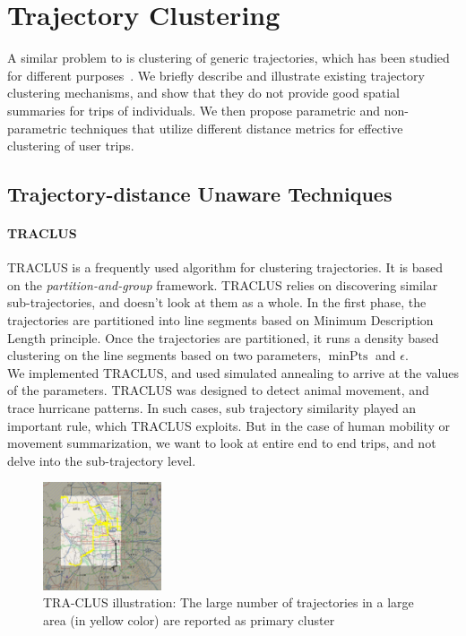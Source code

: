 \section{Trajectory Clustering}
\label{sec:trajCluster}

A similar problem to \trajSummary is clustering of generic trajectories, which has been studied for different purposes~\cite{Lee2007,Li2010}. We briefly describe and illustrate existing trajectory clustering mechanisms, and show that they do not provide good spatial summaries for trips of individuals. We then propose parametric and non-parametric techniques that utilize different distance metrics for effective clustering of user trips.

\subsection{Trajectory-distance Unaware Techniques}

\paragraph{TRACLUS}
TRACLUS is a frequently used algorithm for clustering trajectories. It is based on the \emph{partition-and-group} framework. TRACLUS relies on discovering similar  sub-trajectories, and doesn't look at them as a whole. In the first phase, the trajectories are partitioned into line segments based on Minimum Description Length principle. Once the trajectories are partitioned, it runs a density based clustering on the line segments based on two parameters, $\operatorname{minPts}$ and $\epsilon$. 
\\
We implemented TRACLUS, and used simulated annealing to arrive at the values of the parameters. TRACLUS was designed to detect animal movement, and trace hurricane patterns. In such cases, sub trajectory similarity played an important rule, which TRACLUS exploits. But in the case of human mobility or movement summarization, we want to look at entire end to end trips, and not delve into the sub-trajectory level. 

\begin{figure}
\begin{center}
\includegraphics[width=3.5cm]{figs/TrajClus_cluster.jpg}
\end{center}
\caption{TRA-CLUS illustration: The large number of trajectories in a large area (in yellow color) are reported as primary cluster}
\label{fig:TrajClus_cluster}
\end{figure}

